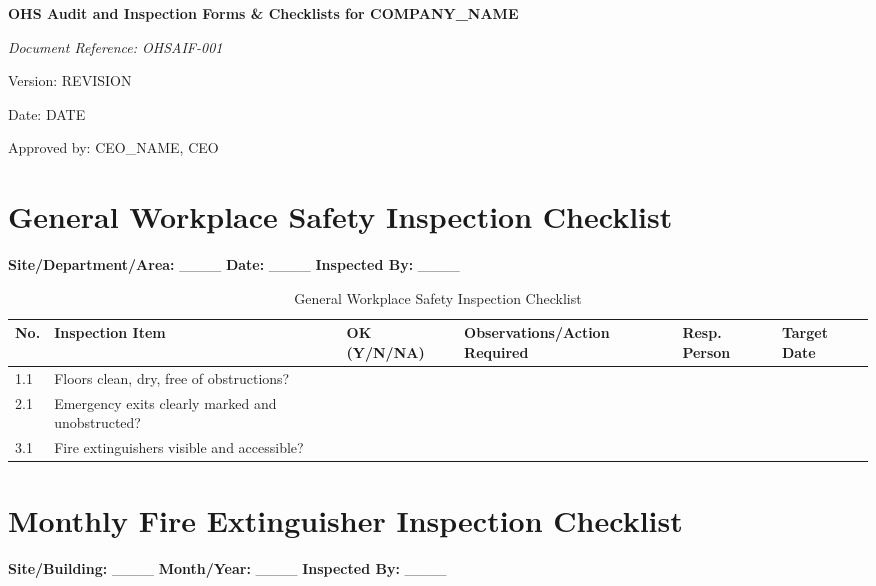 \documentclass[12pt]{article}
\begin{document}
\begin{titlepage}
    \centering
    \vspace*{2cm}
    {\LARGE\bfseries OHS Audit and Inspection Forms \& Checklists for {{COMPANY_NAME}}\par}
    \vspace{1cm}
    {\large\itshape Document Reference: OHSAIF-001\par}
    \vspace{0.5cm}
    {\normalsize Version: {{REVISION}}\par}
    \vspace{0.5cm}
    {\normalsize Date: {{DATE}}\par}
    \vspace{2cm}
    {\normalsize Approved by: {{CEO_NAME}}, CEO\par}
\end{titlepage}

\section{General Workplace Safety Inspection Checklist}

\textbf{Site/Department/Area:} \_\_\_\_ \textbf{Date:} \_\_\_\_ \textbf{Inspected By:} \_\_\_\_

\begin{table}[h]
    \centering
    \begin{tabular}{p{1cm}p{5cm}p{2cm}p{4cm}p{2cm}p{2cm}}
        \toprule
        \textbf{No.} & \textbf{Inspection Item} & \textbf{OK (Y/N/NA)} & \textbf{Observations/Action Required} & \textbf{Resp. Person} & \textbf{Target Date} \\
        \midrule
        1.1 & Floors clean, dry, free of obstructions? & & & & \\
        2.1 & Emergency exits clearly marked and unobstructed? & & & & \\
        3.1 & Fire extinguishers visible and accessible? & & & & \\
        \bottomrule
    \end{tabular}
    \caption{General Workplace Safety Inspection Checklist}
\end{table}

\section{Monthly Fire Extinguisher Inspection Checklist}

\textbf{Site/Building:} \_\_\_\_ \textbf{Month/Year:} \_\_\_\_ \textbf{Inspected By:} \_\_\_\_
\end{document}
